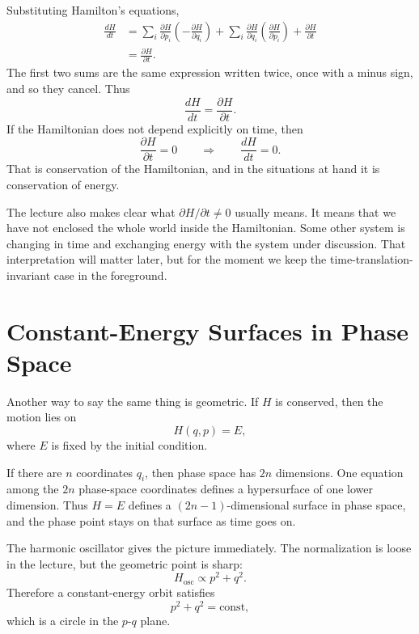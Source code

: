 Substituting Hamilton's equations,
\begin{align}
\frac{dH}{dt}
&=
\sum_i \frac{\partial H}{\partial p_i}\left(-\frac{\partial H}{\partial q_i}\right)
+
\sum_i \frac{\partial H}{\partial q_i}\left(\frac{\partial H}{\partial p_i}\right)
+
\frac{\partial H}{\partial t} \\
&= \frac{\partial H}{\partial t}.
\end{align}
The first two sums are the same expression written twice, once with a minus sign, and so they cancel. Thus
\begin{equation}
\frac{dH}{dt}=\frac{\partial H}{\partial t}.
\end{equation}
If the Hamiltonian does not depend explicitly on time, then
\begin{equation}
\frac{\partial H}{\partial t}=0
\qquad \Longrightarrow \qquad
\frac{dH}{dt}=0.
\end{equation}
That is conservation of the Hamiltonian, and in the situations at hand it is conservation of energy.

The lecture also makes clear what \(\partial H/\partial t\neq 0\) usually means. It means that we have not enclosed the whole world inside the Hamiltonian. Some other system is changing in time and exchanging energy with the system under discussion. That interpretation will matter later, but for the moment we keep the time-translation-invariant case in the foreground.

\section{Constant-Energy Surfaces in Phase Space}

Another way to say the same thing is geometric. If \(H\) is conserved, then the motion lies on
\begin{equation}
H(q,p)=E,
\end{equation}
where \(E\) is fixed by the initial condition.

If there are \(n\) coordinates \(q_i\), then phase space has \(2n\) dimensions. One equation among the \(2n\) phase-space coordinates defines a hypersurface of one lower dimension. Thus \(H=E\) defines a \((2n-1)\)-dimensional surface in phase space, and the phase point stays on that surface as time goes on.

The harmonic oscillator gives the picture immediately. The normalization is loose in the lecture, but the geometric point is sharp:
\begin{equation}
H_{\text{osc}} \propto p^2+q^2.
\end{equation}
Therefore a constant-energy orbit satisfies
\begin{equation}
p^2+q^2=\text{const},
\end{equation}
which is a circle in the \(p\)-\(q\) plane.

